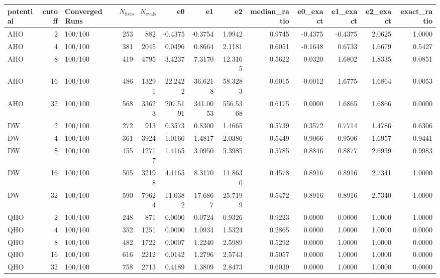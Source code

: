 \begin{tabular}{lrlrrrrrrrrrr}
\toprule
potential & cutoff & Converged Runs & $N_{\text{iters}}$ & $N_{\text{evals}}$ & e0 & e1 & e2 & median_ratio & e0_exact & e1_exact & e2_exact & exact_ratio \\
\midrule
AHO & 2 & 100/100 & 253 & 882 & -0.4375 & -0.3754 & 1.9942 & 0.9745 & -0.4375 & -0.4375 & 2.0625 & 1.0000 \\
AHO & 4 & 100/100 & 381 & 2045 & 0.0496 & 0.8664 & 2.1181 & 0.6051 & -0.1648 & 0.6733 & 1.6679 & 0.5427 \\
AHO & 8 & 100/100 & 419 & 4795 & 3.4237 & 7.3170 & 12.3165 & 0.5622 & 0.0320 & 1.6802 & 1.8335 & 0.0851 \\
AHO & 16 & 100/100 & 486 & 13291 & 22.2422 & 36.6218 & 58.3283 & 0.6015 & -0.0012 & 1.6775 & 1.6864 & 0.0053 \\
AHO & 32 & 100/100 & 568 & 33623 & 207.5191 & 341.0053 & 556.5368 & 0.6175 & 0.0000 & 1.6865 & 1.6866 & 0.0000 \\
DW & 2 & 100/100 & 272 & 913 & 0.3573 & 0.8300 & 1.4665 & 0.5739 & 0.3572 & 0.7714 & 1.4786 & 0.6306 \\
DW & 4 & 100/100 & 361 & 3924 & 1.0166 & 1.4817 & 2.0386 & 0.5449 & 0.9066 & 0.9506 & 1.6957 & 0.9441 \\
DW & 8 & 100/100 & 455 & 12717 & 1.4165 & 3.0950 & 5.3985 & 0.5785 & 0.8846 & 0.8877 & 2.6939 & 0.9983 \\
DW & 16 & 100/100 & 505 & 32198 & 4.1165 & 8.3170 & 11.8630 & 0.4578 & 0.8916 & 0.8916 & 2.7341 & 1.0000 \\
DW & 32 & 100/100 & 590 & 79624 & 11.0382 & 17.6867 & 25.7199 & 0.5472 & 0.8916 & 0.8916 & 2.7340 & 1.0000 \\
QHO & 2 & 100/100 & 248 & 871 & 0.0000 & 0.0724 & 0.9326 & 0.9223 & 0.0000 & 0.0000 & 1.0000 & 1.0000 \\
QHO & 4 & 100/100 & 352 & 1251 & 0.0000 & 1.0934 & 1.5324 & 0.2865 & 0.0000 & 1.0000 & 1.0000 & 0.0000 \\
QHO & 8 & 100/100 & 482 & 1722 & 0.0007 & 1.2240 & 2.5989 & 0.5292 & 0.0000 & 1.0000 & 1.0000 & 0.0000 \\
QHO & 16 & 100/100 & 616 & 2212 & 0.0142 & 1.2796 & 2.5743 & 0.5057 & 0.0000 & 1.0000 & 1.0000 & 0.0000 \\
QHO & 32 & 100/100 & 758 & 2713 & 0.4189 & 1.3809 & 2.8473 & 0.6039 & 0.0000 & 1.0000 & 1.0000 & 0.0000 \\
\bottomrule
\end{tabular}
